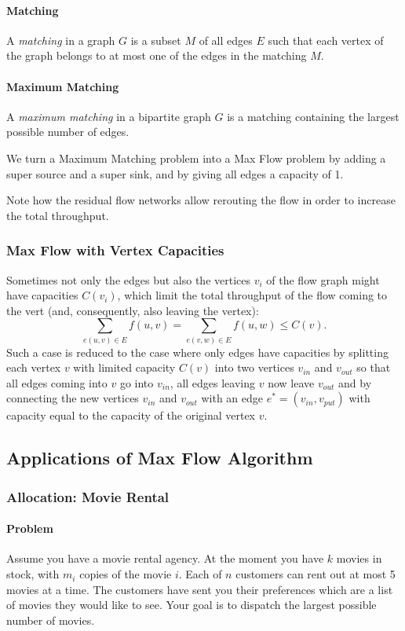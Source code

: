 \paragraph{Matching} 
A \textit{matching} in a graph \(G\) is a subset \(M\) of all edges \(E\) such that each 
vertex of the graph belongs to at most one of the edges in the matching \(M\).

\paragraph{Maximum Matching} 
A \textit{maximum matching} in a bipartite graph \(G\) is a matching containing the 
largest possible number of edges.

We turn a Maximum Matching problem into a Max Flow problem by adding a super
source and a super sink, and by giving all edges a capacity of 1.

Note how the residual flow networks allow rerouting the flow in order to increase
the total throughput.

\subsubsection{Max Flow with Vertex Capacities}
Sometimes not only the edges but also the vertices \(v_i\) of the flow graph might
have capacities \(C(v_i)\), which limit the total throughput of the flow coming to
the vert (and, consequently, also leaving the vertex):
\[\sum_{e(u,v) \in E} f(u,v) = \sum_{e(v,w) \in E} f(u,w) \leq C(v).\]
Such a case is reduced to the case where only edges have capacities by splitting
each vertex \(v\) with limited capacity \(C(v)\) into two vertices \(v_{in}\)
and \(v_{out}\) so that all edges coming into \(v\) go into \(v_{in}\), all edges
leaving \(v\) now leave \(v_{out}\) and by connecting the new vertices \(v_{in}\) and
\(v_{out}\) with an edge \(e^* = (v_{in}, v_{put})\) with capacity equal to the capacity
of the original vertex \(v\).

\subsection{Applications of Max Flow Algorithm}
\subsubsection{Allocation: Movie Rental}
 \paragraph{Problem}
 Assume you have a movie rental agency. At the moment you have \(k\) movies in stock,
 with \(m_i\) copies of the movie \(i\). Each of \(n\) customers can rent out at most 5
 movies at a time. The customers have sent you their preferences which are a list
 of movies they would like to see. Your goal is to dispatch the largest possible
 number of movies.

